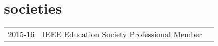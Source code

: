 \documentclass[letterpaper]{deedy-resume} %
\begin{document}
\begin{minipage}[t]{0.66\textwidth}
\section{societies} 

\begin{tabular}{rll}
2015-16 & IEEE Education Society Professional Member  

\end{tabular}

\sectionspace %


\end{minipage} %








\sectionspace
\sectionspace
\sectionspace
\noindent\makebox[\linewidth]{\rule{\paperwidth}{0.4pt}}
\end{document}
